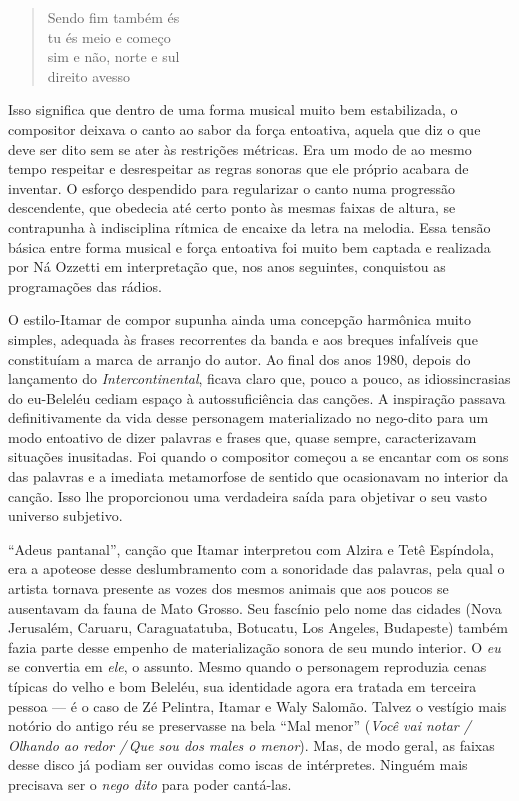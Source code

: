 \begin{verse}
Sendo fim também és\\
tu és meio e começo\\
sim e não, norte e sul\\
direito avesso
\end{verse}

Isso significa que dentro de uma forma musical muito bem estabilizada, o
compositor deixava o canto ao sabor da força entoativa, aquela que diz o
que deve ser dito sem se ater às restrições métricas. Era um modo de ao
mesmo tempo respeitar e desrespeitar as regras sonoras que ele próprio
acabara de inventar. O esforço despendido para regularizar o canto numa
progressão descendente, que obedecia até certo ponto às mesmas faixas de
altura, se contrapunha à indisciplina rítmica de encaixe da letra na
melodia. Essa tensão básica entre forma musical e força entoativa foi
muito bem captada e realizada por Ná Ozzetti em interpretação que, nos
anos seguintes, conquistou as programações das rádios.

O estilo-Itamar de compor supunha ainda uma concepção harmônica muito
simples, adequada às frases recorrentes da banda e aos breques
infalíveis que constituíam a marca de arranjo do autor. Ao final dos
anos 1980, depois do lançamento do \textit{Intercontinental}, ficava claro que,
pouco a pouco, as idiossincrasias do eu-Beleléu cediam espaço à
autossuficiência das canções. A inspiração passava definitivamente da
vida desse personagem materializado no nego-dito para um modo entoativo
de dizer palavras e frases que, quase sempre, caracterizavam situações
inusitadas. Foi quando o compositor começou a se encantar com os sons
das palavras e a imediata metamorfose de sentido que ocasionavam no
interior da canção. Isso lhe proporcionou uma verdadeira saída para
objetivar o seu vasto universo subjetivo.

``Adeus pantanal'', canção que Itamar interpretou com Alzira e Tetê
Espíndola, era a apoteose desse deslumbramento com a sonoridade das
palavras, pela qual o artista tornava presente as vozes dos mesmos
animais que aos poucos se ausentavam da fauna de Mato Grosso. Seu
fascínio pelo nome das cidades (Nova Jerusalém, Caruaru, Caraguatatuba,
Botucatu, Los Angeles, Budapeste) também fazia parte desse empenho de
materialização sonora de seu mundo interior. O \textit{eu} se convertia em
\textit{ele}, o assunto. Mesmo quando o personagem reproduzia cenas típicas
do velho e bom Beleléu, sua identidade agora era tratada em terceira
pessoa --- é o caso de Zé Pelintra, Itamar e Waly Salomão. Talvez o
vestígio mais notório do antigo réu se preservasse na bela ``Mal menor''
(\textit{Você vai notar /\,Olhando ao redor /\,Que sou dos males o menor}).
Mas, de modo geral, as faixas desse disco já podiam ser ouvidas como
iscas de intérpretes. Ninguém mais precisava ser o \textit{nego dito} para poder
cantá-las.

